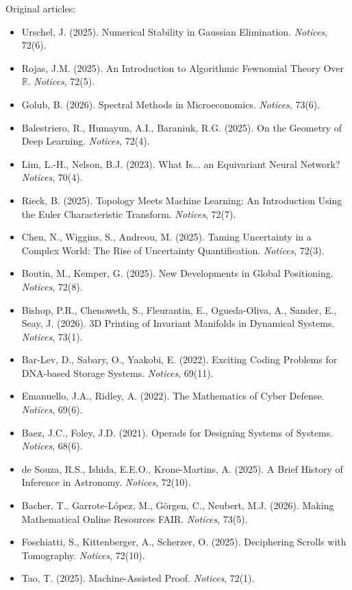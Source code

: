 \documentclass[11pt,oneside]{book}
\theoremstyle{definition}
\begin{document}
Original articles:
\begin{itemize}
    \item Urschel, J. (2025). Numerical Stability in Gaussian Elimination. \textit{Notices}, 72(6).
    \item Rojas, J.M. (2025). An Introduction to Algorithmic Fewnomial Theory Over $\mathbb{R}$. \textit{Notices}, 72(5).
    \item Golub, B. (2026). Spectral Methods in Microeconomics. \textit{Notices}, 73(6).
    \item Balestriero, R., Humayun, A.I., Baraniuk, R.G. (2025). On the Geometry of Deep Learning. \textit{Notices}, 72(4).
    \item Lim, L.-H., Nelson, B.J. (2023). What Is... an Equivariant Neural Network? \textit{Notices}, 70(4).
    \item Rieck, B. (2025). Topology Meets Machine Learning: An Introduction Using the Euler Characteristic Transform. \textit{Notices}, 72(7).
    \item Chen, N., Wiggins, S., Andreou, M. (2025). Taming Uncertainty in a Complex World: The Rise of Uncertainty Quantification. \textit{Notices}, 72(3).
    \item Boutin, M., Kemper, G. (2025). New Developments in Global Positioning. \textit{Notices}, 72(8).
    \item Bishop, P.R., Chenoweth, S., Fleurantin, E., Ogueda-Oliva, A., Sander, E., Seay, J. (2026). 3D Printing of Invariant Manifolds in Dynamical Systems. \textit{Notices}, 73(1).
    \item Bar-Lev, D., Sabary, O., Yaakobi, E. (2022). Exciting Coding Problems for DNA-based Storage Systems. \textit{Notices}, 69(11).
    \item Emanuello, J.A., Ridley, A. (2022). The Mathematics of Cyber Defense. \textit{Notices}, 69(6).
    \item Baez, J.C., Foley, J.D. (2021). Operads for Designing Systems of Systems. \textit{Notices}, 68(6).
    \item de Souza, R.S., Ishida, E.E.O., Krone-Martins, A. (2025). A Brief History of Inference in Astronomy. \textit{Notices}, 72(10).
    \item Bacher, T., Garrote-López, M., Görgen, C., Neubert, M.J. (2026). Making Mathematical Online Resources FAIR. \textit{Notices}, 73(5).
    \item Foschiatti, S., Kittenberger, A., Scherzer, O. (2025). Deciphering Scrolls with Tomography. \textit{Notices}, 72(10).
    \item Tao, T. (2025). Machine-Assisted Proof. \textit{Notices}, 72(1).
\end{itemize}
\end{document}
